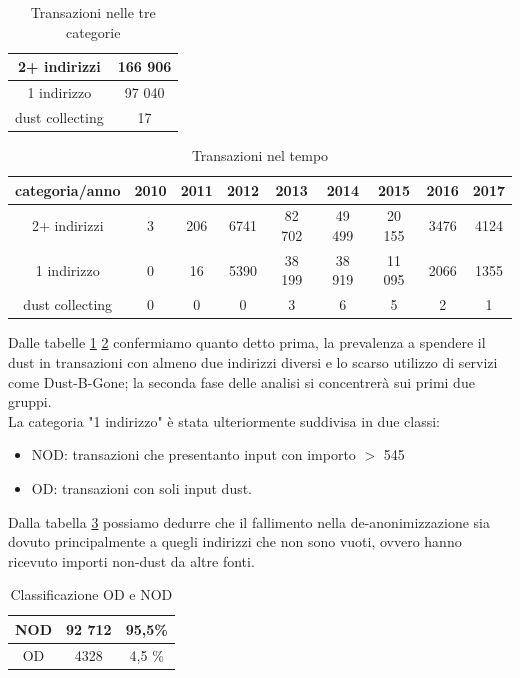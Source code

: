 \begin{table}[H]
    \centering
    \begin{tabular}{|c|c|}
        \hline
        2+ indirizzi & 166 906\\
        \hline
        1 indirizzo & 97 040\\
        \hline
        dust collecting & 17\\
        \hline
    \end{tabular}
    \caption{Transazioni nelle tre categorie}
    \label{tab:tx_categories}
\end{table}
\begin{table}[H]
    \centering
    \begin{tabular}{|c|c|c|c|c|c|c|c|c|}
        \hline
            categoria/anno  & 2010 & 2011 & 2012 & 2013 & 2014 & 2015 & 2016 & 2017\\
        \hline 
         2+ indirizzi &  3 & 206 & 6741 & 82 702 & 49 499 & 20 155 & 3476 & 4124 \\
         \hline
         1 indirizzo & 0 & 16 & 5390 & 38 199 & 38 919 & 11 095 & 2066 & 1355  \\
         \hline
         dust collecting & 0 & 0 & 0 & 3 & 6 & 5 & 2 & 1 \\
         \hline
    \end{tabular}
    \caption{Transazioni nel tempo}
    \label{tab:tx_categories_year}
\end{table}
Dalle tabelle \ref{tab:tx_categories} \ref{tab:tx_categories_year} confermiamo quanto detto prima, la prevalenza a spendere il dust in transazioni con almeno due indirizzi diversi e lo scarso utilizzo di servizi come Dust-B-Gone; la seconda fase delle analisi si concentrerà sui primi due gruppi.\\
La categoria "1 indirizzo" è stata ulteriormente suddivisa in due classi:
\begin{itemize}
    \item NOD: transazioni che presentanto input con importo $>$ 545  
    \item OD: transazioni con soli input dust.
\end{itemize}
Dalla tabella \ref{tab:OD_NOD_failed} possiamo dedurre che il fallimento nella de-anonimizzazione sia dovuto principalmente a quegli indirizzi che non sono vuoti, ovvero hanno ricevuto importi non-dust da altre fonti. 
\begin{table}[H]
    \centering
    \begin{tabular}{|c|c|c|}
        \hline
            NOD  & 92 712 & 95,5\%\\
        \hline 
            OD  & 4328 & 4,5 \%\\
        \hline
    \end{tabular}
    \caption{Classificazione OD e NOD}
    \label{tab:OD_NOD_failed}
\end{table}
